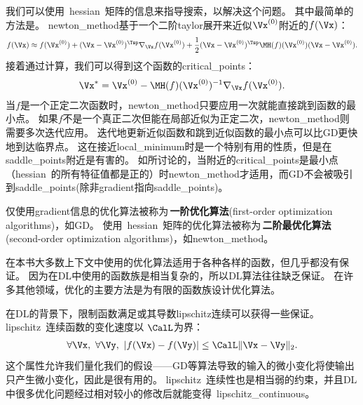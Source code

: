 
我们可以使用~\gls{hessian}~矩阵的信息来指导搜索，以解决这个问题。
其中最简单的方法是。
\gls{newton_method}基于一个二阶\gls{taylor}展开来近似$\Vx^{(0)}$附近的$f(\Vx)$：
\begin{align}
 f(\Vx) \approx f(\Vx^{(0)}) + (\Vx - \Vx^{(0)})^\Tsp \nabla_{\Vx} f(\Vx^{(0)}) + 
 \frac{1}{2}  (\Vx - \Vx^{(0)})^\Tsp \MH(f)(\Vx^{(0)})  (\Vx - \Vx^{(0)}).
\end{align}
接着通过计算，我们可以得到这个函数的\gls{critical_points}：
\begin{align} \label{eq:newtonstep}
 \Vx^* =  \Vx^{(0)} -  \MH(f)(\Vx^{(0)})^{-1}  \nabla_{\Vx} f(\Vx^{(0)}) .
\end{align}
当$f$是一个正定二次函数时，\gls{newton_method}只要应用一次就能直接跳到函数的最小点。
如果$f$不是一个真正二次但能在局部近似为正定二次，\gls{newton_method}则需要多次迭代应用。
迭代地更新近似函数和跳到近似函数的最小点可以比\gls{GD}更快地到达临界点。
这在接近\gls{local_minimum}时是一个特别有用的性质，但是在\gls{saddle_points}附近是有害的。
如所讨论的，当附近的\gls{critical_points}是最小点（\gls{hessian}~的所有特征值都是正的）时\gls{newton_method}才适用，而\gls{GD}不会被吸引到\gls{saddle_points}(除非\gls{gradient}指向\gls{saddle_points})。

仅使用\gls{gradient}信息的优化算法被称为\,\textbf{一阶优化算法}(first-order optimization algorithms)，如\gls{GD}。
使用~\gls{hessian}~矩阵的优化算法被称为\,\textbf{二阶最优化算法}(second-order optimization algorithms)\citep{NumOptBook}，如\gls{newton_method}。

在本书大多数上下文中使用的优化算法适用于各种各样的函数，但几乎都没有保证。
因为在\gls{DL}中使用的函数族是相当复杂的，所以\gls{DL}算法往往缺乏保证。
在许多其他领域，优化的主要方法是为有限的函数族设计优化算法。

在\gls{DL}的背景下，限制函数满足或其导数\gls{lipschitz}连续可以获得一些保证。
\gls{lipschitz}~连续函数的变化速度以 $\CalL$为界：
\begin{align}
 \forall \Vx,~\forall \Vy, ~| f(\Vx) - f(\Vy)|  \leq \CalL \| \Vx - \Vy \|_2 .
\end{align}
这个属性允许我们量化我们的假设——\gls{GD}等算法导致的输入的微小变化将使输出只产生微小变化，因此是很有用的。
\gls{lipschitz}~连续性也是相当弱的约束，并且\gls{DL}中很多优化问题经过相对较小的修改后就能变得~\gls{lipschitz_continuous}。

